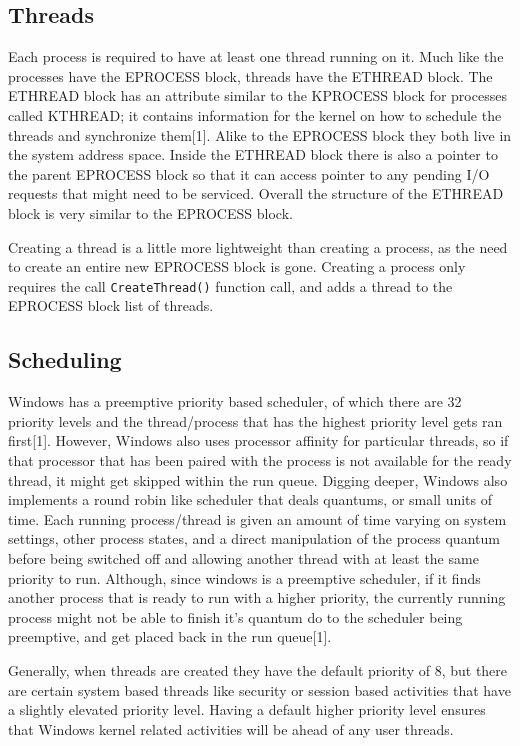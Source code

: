\documentclass{article}
\begin{document}
\subsection{Threads}
	Each process is required to have at least one thread running on it. Much like the processes have the EPROCESS block, threads have the ETHREAD block. The ETHREAD block has an attribute similar to the KPROCESS block for processes called KTHREAD; it contains information for the kernel on how to schedule the threads and synchronize them[1]. Alike to the EPROCESS block they both live in the system address space. Inside the ETHREAD block there is also a pointer to the parent EPROCESS block so that it can access pointer to any pending I/O requests that might need to be serviced. Overall the structure of the ETHREAD block is very similar to the EPROCESS block.

	Creating a thread is a little more lightweight than creating a process, as the need to create an entire new EPROCESS block is gone. Creating a process only requires the call \texttt{CreateThread()} function call, and adds a thread to the EPROCESS block list of threads.

\subsection{Scheduling}
	Windows has a preemptive priority based scheduler, of which there are 32 priority levels and the thread/process that has the highest priority level gets ran first[1]. However, Windows also uses processor affinity for particular threads, so if that processor that has been paired with the process is not available for the ready thread, it might get skipped within the run queue. Digging deeper, Windows also implements a round robin like scheduler that deals quantums, or small units of time. Each running process/thread is given an amount of time varying on system settings, other process states, and a direct manipulation of the process quantum before being switched off and allowing another thread with at least the same priority to run. Although, since windows is a preemptive scheduler, if it finds another process that is ready to run with a higher priority, the currently running process might not be able to finish it’s quantum do to the scheduler being preemptive, and get placed back in the run queue[1].

	Generally, when threads are created they have the default priority of 8, but there are certain system based threads like security or session based activities that have a slightly elevated priority level. Having a default higher priority level ensures that Windows kernel related activities will be ahead of any user threads.
\end{document}
